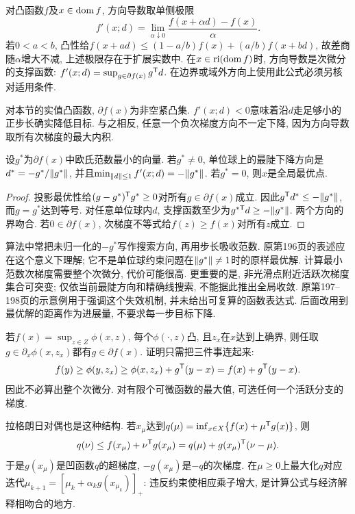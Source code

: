 对凸函数$f$及$x\in\operatorname{dom} f$, 方向导数取单侧极限
\[
 f'(x;d)=\lim_{\alpha\downarrow0}\frac{f(x+\alpha d)-f(x)}{\alpha}.
\]
若$0<a<b$, 凸性给$f(x+ad)\le(1-a/b)f(x)+(a/b)f(x+bd)$, 故差商随$\alpha$增大不减, 上述极限存在于扩展实数中. 在$x\in\operatorname{ri}(\operatorname{dom} f)$时, 方向导数是次微分的支撑函数: $f'(x;d)=\sup_{g\in\partial f(x)}g^{\mathsf T} d$. 在边界或域外方向上使用此公式必须另核对适用条件.

对本节的实值凸函数, $\partial f(x)$为非空紧凸集. $f'(x;d)<0$意味着沿$d$走足够小的正步长确实降低目标. 与之相反, 任意一个负次梯度方向不一定下降, 因为方向导数取所有次梯度的最大内积.

\begin{proposition}
设$g^*$为$\partial f(x)$中欧氏范数最小的向量. 若$g^*\ne0$, 单位球上的最陡下降方向是$d^*=-g^*/\lVert g^*\rVert$, 并且$\min_{\lVert d\rVert\le1}f'(x;d)=-\lVert g^*\rVert$. 若$g^*=0$, 则$x$是全局最优点.
\end{proposition}
\begin{proof}
投影最优性给$(g-g^*)^{\mathsf T} g^*\ge0$对所有$g\in\partial f(x)$成立. 因此$g^{\mathsf T} d^*\le-\lVert g^*\rVert$, 而$g=g^*$达到等号. 对任意单位球内$d$, 支撑函数至少为$g^{*\mathsf T}d\ge-\lVert g^*\rVert$. 两个方向的界吻合. 若$0\in\partial f(x)$, 次梯度不等式给$f(z)\ge f(x)$对所有$z$成立.
\end{proof}

算法中常把未归一化的$-g^*$写作搜索方向, 再用步长吸收范数. 原第196页的表述应在这个意义下理解; 它不是单位球约束问题在$\lVert g^*\rVert\ne1$时的原样最优解. 计算最小范数次梯度需要整个次微分, 代价可能很高. 更重要的是, 非光滑点附近活跃次梯度集合可突变; 仅依当前最陡方向和精确线搜索, 不能据此推出全局收敛. 原第197--198页的示意例用于强调这个失效机制, 并未给出可复算的函数表达式. 后面改用到最优解的距离作为进展量, 不要求每一步目标下降.

若$f(x)=\sup_{z\in Z}\phi(x,z)$, 每个$\phi(\cdot,z)$凸, 且$z_x$在$x$达到上确界, 则任取$g\in\partial_x\phi(x,z_x)$都有$g\in\partial f(x)$. 证明只需把三件事连起来:
\[
 f(y)\ge\phi(y,z_x)\ge\phi(x,z_x)+g^{\mathsf T}(y-x)=f(x)+g^{\mathsf T}(y-x).
\]
因此不必算出整个次微分. 对有限个可微函数的最大值, 可选任何一个活跃分支的梯度.

拉格朗日对偶也是这种结构. 若$x_\mu$达到$q(\mu)=\inf_{x\in X}\{f(x)+\mu^{\mathsf T} g(x)\}$, 则
\[
 q(\nu)\le f(x_\mu)+\nu^{\mathsf T} g(x_\mu)
 =q(\mu)+g(x_\mu)^{\mathsf T}(\nu-\mu).
\]
于是$g(x_\mu)$是凹函数$q$的超梯度, $-g(x_\mu)$是$-q$的次梯度. 在$\mu\ge0$上最大化$q$对应迭代$\mu_{k+1}=[\mu_k+\alpha_k g(x_{\mu_k})]_+$: 违反约束使相应乘子增大, 是计算公式与经济解释相吻合的地方.

